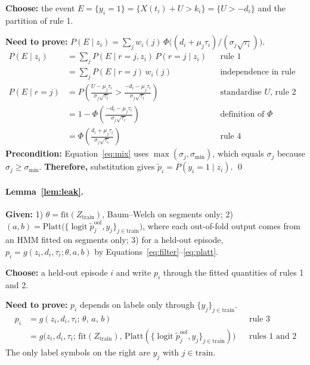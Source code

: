 \documentclass{article}
\begin{document}
\textbf{Choose:} the event $E=\{y_i=1\}=\{X(t_i)+U>k_i\}=\{U>-d_i\}$ and the partition of rule 1.

\textbf{Need to prove:} $P(E\mid z_i)=\sum_j w_i(j)\,\Phi\big((d_i+\mu_j\tau_i)/(\sigma_j\sqrt{\tau_i})\big)$.
\begin{align*}
P(E\mid z_i) &= \textstyle\sum_j P(E\mid r=j, z_i)\,P(r=j\mid z_i) && \text{rule 1}\\
             &= \textstyle\sum_j P(E\mid r=j)\,w_i(j) && \text{independence in rule 2, rule 3}\\
P(E\mid r=j) &= P\!\left(\tfrac{U-\mu_j\tau_i}{\sigma_j\sqrt{\tau_i}} > \tfrac{-d_i-\mu_j\tau_i}{\sigma_j\sqrt{\tau_i}}\right) && \text{standardise $U$, rule 2}\\
             &= 1-\Phi\!\left(\tfrac{-d_i-\mu_j\tau_i}{\sigma_j\sqrt{\tau_i}}\right) && \text{definition of $\Phi$}\\
             &= \Phi\!\left(\tfrac{d_i+\mu_j\tau_i}{\sigma_j\sqrt{\tau_i}}\right) && \text{rule 4}
\end{align*}
\textbf{Precondition:} Equation~\eqref{eq:mix} uses $\max(\sigma_j,\sigma_{\min})$, which equals $\sigma_j$ because $\sigma_j\ge\sigma_{\min}$.
\textbf{Therefore,} substitution gives $\tilde p_i=P(y_i=1\mid z_i)$. \qed

\paragraph{Lemma~\ref{lem:leak}.}
\textbf{Given:}
1) $\theta=\mathrm{fit}(Z_{\text{train}})$, Baum--Welch on segments only;
2) $(a,b)=\mathrm{Platt}\big(\{\operatorname{logit}\tilde p_j^{\text{oof}}, y_j\}_{j\in\text{train}}\big)$, where each out-of-fold output comes from an HMM fitted on segments only;
3) for a held-out episode, $p_i=g(z_i,d_i,\tau_i;\theta,a,b)$ by Equations~\eqref{eq:filter}--\eqref{eq:platt}.

\textbf{Choose:} a held-out episode $i$ and write $p_i$ through the fitted quantities of rules 1 and 2.

\textbf{Need to prove:} $p_i$ depends on labels only through $\{y_j\}_{j\in\text{train}}$.
\begin{align*}
p_i &= g(z_i,d_i,\tau_i;\,\theta,\,a,\,b) && \text{rule 3}\\
    &= g\big(z_i,d_i,\tau_i;\,\mathrm{fit}(Z_{\text{train}}),\,\mathrm{Platt}(\{\operatorname{logit}\tilde p_j^{\text{oof}},y_j\}_{j\in\text{train}})\big) && \text{rules 1 and 2}
\end{align*}
The only label symbols on the right are $y_j$ with $j\in\text{train}$.
\end{document}
